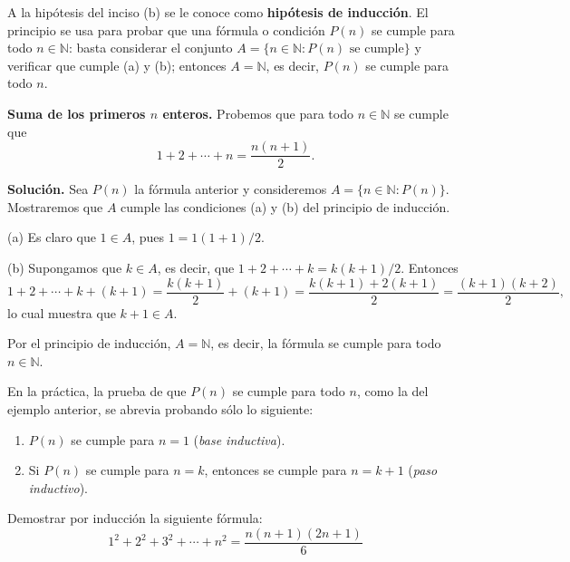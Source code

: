 \documentclass[12pt,a4paper]{book}
\begin{document}
  A la hipótesis del inciso (b) se le conoce como \textbf{hipótesis de inducción}. El principio se usa para probar que una fórmula o condición $P(n)$ se cumple para todo $n \in \mathbb{N}$: basta considerar el conjunto $A=\{n \in \mathbb{N} : P(n) \text{ se cumple}\}$ y verificar que cumple (a) y (b); entonces $A=\mathbb{N}$, es decir, $P(n)$ se cumple para todo $n$.
  
  \begin{ejemplo}
    \textbf{Suma de los primeros $n$ enteros.}
    Probemos que para todo $n \in \mathbb{N}$ se cumple que
    \begin{equation*}
      1+2+\cdots+n = \frac{n(n+1)}{2}.
    \end{equation*}
  
    \textbf{Solución.} Sea $P(n)$ la fórmula anterior y consideremos $A=\{n \in \mathbb{N} : P(n)\}$. Mostraremos que $A$ cumple las condiciones (a) y (b) del principio de inducción.
  
    (a) Es claro que $1 \in A$, pues $1 = 1(1+1)/2$.
  
    (b) Supongamos que $k \in A$, es decir, que $1+2+\cdots+k = k(k+1)/2$. Entonces
    \begin{equation*}
      1+2+\cdots+k+(k+1) = \frac{k(k+1)}{2}+(k+1) = \frac{k(k+1)+2(k+1)}{2} = \frac{(k+1)(k+2)}{2},
    \end{equation*}
    lo cual muestra que $k+1 \in A$.
  
    Por el principio de inducción, $A=\mathbb{N}$, es decir, la fórmula se cumple para todo $n \in \mathbb{N}$.
  \end{ejemplo}
  
  En la práctica, la prueba de que $P(n)$ se cumple para todo $n$, como la del ejemplo anterior, se abrevia probando sólo lo siguiente:
  \begin{enumerate}[label=(\roman*)]
    \item $P(n)$ se cumple para $n=1$ (\emph{base inductiva}).
    \item Si $P(n)$ se cumple para $n=k$, entonces se cumple para $n=k+1$ (\emph{paso inductivo}).
  \end{enumerate}
  
  \begin{problema}
    Demostrar por inducción la siguiente fórmula:
    \begin{equation*}
      1^2+2^2+3^2+\cdots+n^2 = \frac{n(n+1)(2n+1)}{6}
    \end{equation*}
  \end{problema}
  
\end{document}
